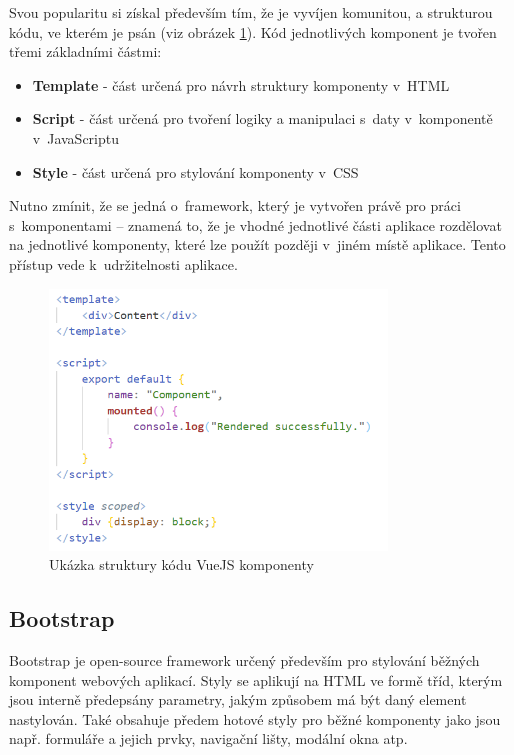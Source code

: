 	Svou popularitu si získal především tím, že je vyvíjen komunitou, a strukturou kódu, ve kterém je psán (viz obrázek \ref{fig:vue_kod_komponenty}). Kód jednotlivých komponent je tvořen třemi základními částmi:
	
	\begin{itemize}
		\item \textbf{Template} - část určená pro návrh struktury komponenty v~HTML
		\item \textbf{Script} - část určená pro tvoření logiky a manipulaci s~daty v~komponentě v~JavaScriptu
		\item \textbf{Style} - část určená pro stylování komponenty v~CSS
	\end{itemize}

	Nutno zmínit, že se jedná o~framework, který je vytvořen právě pro práci s~komponentami – znamená to, že je vhodné jednotlivé části aplikace rozdělovat na jednotlivé komponenty, které lze použít později v~jiném místě aplikace. Tento přístup vede k~udržitelnosti aplikace. \cite{VueJSSyntax}\cite{VueJS2}
	
	\begin{figure}[h]
		\centering
		\includegraphics[width=0.8\textwidth]{img/vue_kod_komponenty.png}
		\caption{Ukázka struktury kódu VueJS komponenty}
		\label{fig:vue_kod_komponenty}
	\end{figure}
	
	\subsection{Bootstrap}
	Bootstrap je open-source framework určený především pro stylování běžných komponent webových aplikací. Styly se aplikují na HTML ve formě tříd, kterým jsou interně předepsány parametry, jakým způsobem má být daný element nastylován. Také obsahuje předem hotové styly pro běžné komponenty jako jsou např. formuláře a jejich prvky, navigační lišty, modální okna atp. \cite{Bootstrap1}\cite{Bootstrap2}\cite{Bootstrap3}
	
